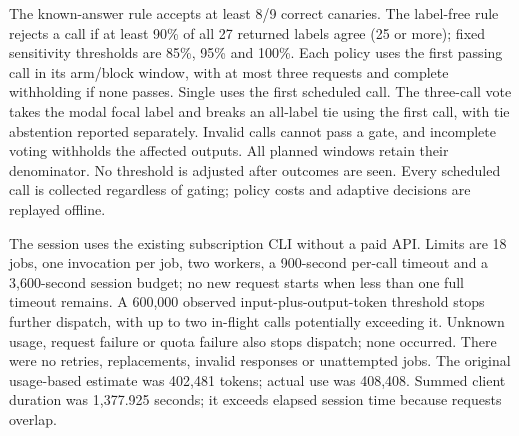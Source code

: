 The known-answer rule accepts at least 8/9 correct canaries. The label-free rule rejects a call if at least 90\% of all 27 returned labels agree (25 or more); fixed sensitivity thresholds are 85\%, 95\% and 100\%. Each policy uses the first passing call in its arm/block window, with at most three requests and complete withholding if none passes. Single uses the first scheduled call. The three-call vote takes the modal focal label and breaks an all-label tie using the first call, with tie abstention reported separately. Invalid calls cannot pass a gate, and incomplete voting withholds the affected outputs. All planned windows retain their denominator. No threshold is adjusted after outcomes are seen. Every scheduled call is collected regardless of gating; policy costs and adaptive decisions are replayed offline.

The session uses the existing subscription CLI without a paid API. Limits are 18 jobs, one invocation per job, two workers, a 900-second per-call timeout and a 3,600-second session budget; no new request starts when less than one full timeout remains. A 600,000 observed input-plus-output-token threshold stops further dispatch, with up to two in-flight calls potentially exceeding it. Unknown usage, request failure or quota failure also stops dispatch; none occurred. There were no retries, replacements, invalid responses or unattempted jobs. The original usage-based estimate was 402,481 tokens; actual use was 408,408. Summed client duration was 1,377.925 seconds; it exceeds elapsed session time because requests overlap.

